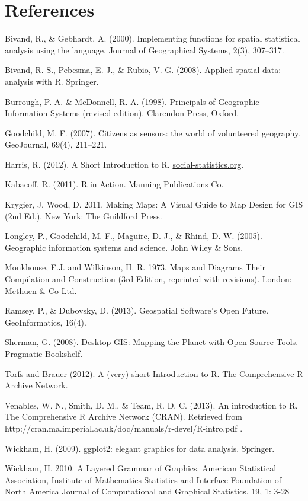 \documentclass[]{article}
\begin{document}
\newpage \section{References}

Bivand, R., \& Gebhardt, A. (2000). Implementing functions for spatial
statistical analysis using the language. Journal of Geographical
Systems, 2(3), 307--317.

Bivand, R. S., Pebesma, E. J., \& Rubio, V. G. (2008). Applied spatial
data: analysis with R. Springer.

Burrough, P. A. \& McDonnell, R. A. (1998). Principals of Geographic
Information Systems (revised edition). Clarendon Press, Oxford.

Goodchild, M. F. (2007). Citizens as sensors: the world of volunteered
geography. GeoJournal, 69(4), 211--221.

Harris, R. (2012). A Short Introduction to R.
\href{http://www.social-statistics.org/}{social-statistics.org}.

Kabacoff, R. (2011). R in Action. Manning Publications Co.

Krygier, J. Wood, D. 2011. Making Maps: A Visual Guide to Map Design for
GIS (2nd Ed.). New York: The Guildford Press.

Longley, P., Goodchild, M. F., Maguire, D. J., \& Rhind, D. W. (2005).
Geographic information systems and science. John Wiley \& Sons.

Monkhouse, F.J. and Wilkinson, H. R. 1973. Maps and Diagrams Their
Compilation and Construction (3rd Edition, reprinted with revisions).
London: Methuen \& Co Ltd.

Ramsey, P., \& Dubovsky, D. (2013). Geospatial Software's Open Future.
GeoInformatics, 16(4).

Sherman, G. (2008). Desktop GIS: Mapping the Planet with Open Source
Tools. Pragmatic Bookshelf.

Torfs and Brauer (2012). A (very) short Introduction to R. The
Comprehensive R Archive Network.

Venables, W. N., Smith, D. M., \& Team, R. D. C. (2013). An introduction
to R. The Comprehensive R Archive Network (CRAN). Retrieved from
http://cran.ma.imperial.ac.uk/doc/manuals/r-devel/R-intro.pdf .

Wickham, H. (2009). ggplot2: elegant graphics for data analysis.
Springer.

Wickham, H. 2010. A Layered Grammar of Graphics. American Statistical
Association, Institute of Mathematics Statistics and Interface
Foundation of North America Journal of Computational and Graphical
Statistics. 19, 1: 3-28
\end{document}
